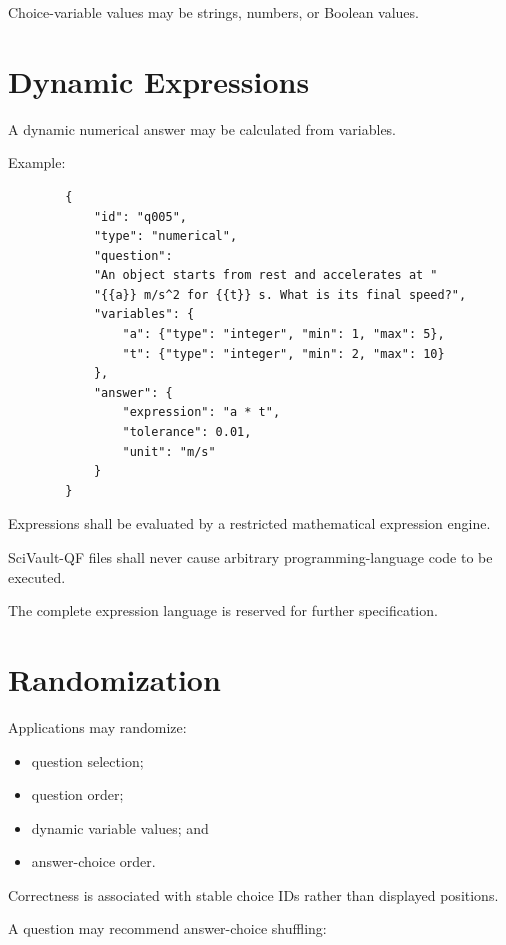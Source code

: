 \documentclass[11pt]{article}
\begin{document}
	Choice-variable values may be strings, numbers, or Boolean values.
	
	\section{Dynamic Expressions}
	
	A dynamic numerical answer may be calculated from variables.
	
	Example:
	
	\begin{lstlisting}
		{
			"id": "q005",
			"type": "numerical",
			"question":
			"An object starts from rest and accelerates at "
			"{{a}} m/s^2 for {{t}} s. What is its final speed?",
			"variables": {
				"a": {"type": "integer", "min": 1, "max": 5},
				"t": {"type": "integer", "min": 2, "max": 10}
			},
			"answer": {
				"expression": "a * t",
				"tolerance": 0.01,
				"unit": "m/s"
			}
		}
	\end{lstlisting}
	
	Expressions shall be evaluated by a restricted mathematical expression
	engine.
	
	SciVault-QF files shall never cause arbitrary programming-language code to
	be executed.
	
	The complete expression language is reserved for further specification.
	
	\section{Randomization}
	
	Applications may randomize:
	
	\begin{itemize}
		\item question selection;
		\item question order;
		\item dynamic variable values; and
		\item answer-choice order.
	\end{itemize}
	
	Correctness is associated with stable choice IDs rather than displayed
	positions.
	
	A question may recommend answer-choice shuffling:
	
\end{document}
